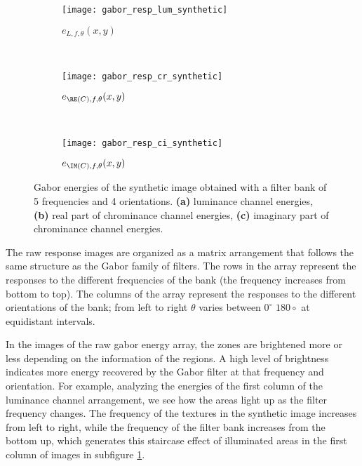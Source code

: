 \begin{figure}[!ht]
    \centering
    \begin{subfigure}[b]{\textwidth}   
        \texttt{[image: gabor\_resp\_lum\_synthetic]}
        \caption{$e_{L, f, \theta}(x,y)$} 
        \label{fig:lum_raw_gabor_energies}
    \end{subfigure} \\ [2ex]   
    \begin{subfigure}[b]{\textwidth}   
    	\texttt{[image: gabor\_resp\_cr\_synthetic]}
    	\caption{$e_{\RE(C), f, \theta}(x,y)$}
        \label{fig:cr_raw_gabor_energie}
    \end{subfigure} \\ [2ex]    	
    \begin{subfigure}[b]{\textwidth}  
        \texttt{[image: gabor\_resp\_ci\_synthetic]}
        \caption{$e_{\IM(C), f, \theta}(x,y)$}
        \label{fig:ci_raw_gabor_energies} 
    \end{subfigure} 
    	    
    \caption{Gabor energies of the synthetic image obtained with a filter bank of 5 frequencies and 4 orientations. \small\textbf{\textsf{(a)}} luminance channel energies, \small\textbf{\textsf{(b)}} real part of chrominance channel energies, \small\textbf{\textsf{(c)}} imaginary part of chrominance channel energies.}\label{fig:synthetic_img_gresponses}    
\end{figure}

The raw response images are organized as a matrix arrangement that follows the same structure as the Gabor family of filters. The rows in the array represent the responses to the different frequencies of the bank (the frequency increases from bottom to top). The columns of the array represent the responses to the different orientations of the bank; from left to right $\theta$ varies between $ 0^\circ $ $180\circ$ at equidistant intervals.

In the images of the raw gabor energy array, the zones are brightened more or less depending on the information of the regions. A high level of brightness indicates more energy recovered by the Gabor filter at that frequency and orientation. For example, analyzing the energies of the first column of the luminance channel arrangement, we see how the areas light up as the filter frequency changes. The frequency of the textures in the synthetic image increases from left to right, while the frequency of the filter bank increases from the bottom up, which generates this staircase effect of illuminated areas in the first column of images in subfigure \ref{fig:lum_raw_gabor_energies}.

